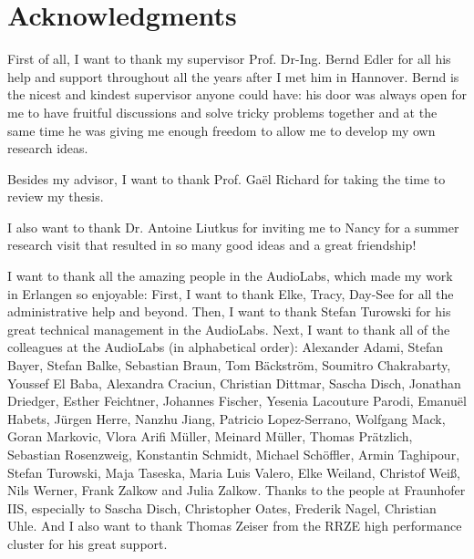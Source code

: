 
\bigskip

\begingroup
\let\clearpage\relax
\let\cleardoublepage\relax
\let\cleardoublepage\relax
\chapter*{Acknowledgments}

First of all, I want to thank my supervisor Prof. Dr-Ing. Bernd Edler for all his help and support throughout all the years after I met him in Hannover. Bernd is the nicest and kindest supervisor anyone could have: his door was always open for me to have fruitful discussions and solve tricky problems together and at the same time he was giving me enough freedom to allow me to develop my own research ideas.

\bigskip

Besides my advisor, I want to thank Prof. Gaël Richard for taking the time to review my thesis.

\bigskip
I also want to thank Dr. Antoine Liutkus for inviting me to Nancy for a summer research visit that resulted in so many good ideas and a great friendship!

\bigskip

I want to thank all the amazing people in the AudioLabs, which made my work in Erlangen so enjoyable: First, I want to thank Elke, Tracy, Day-See for all the administrative help and beyond. Then, I want to thank Stefan Turowski for his great technical management in the AudioLabs. Next, I want to thank all of the colleagues at the AudioLabs (in alphabetical order): 
Alexander Adami, Stefan Bayer, Stefan Balke, Sebastian Braun, Tom Bäckström, Soumitro Chakrabarty, Youssef El Baba, Alexandra Craciun, Christian Dittmar, Sascha Disch, Jonathan Driedger, Esther Feichtner, Johannes Fischer, Yesenia Lacouture Parodi, Emanuël Habets, Jürgen Herre, Nanzhu Jiang, Patricio Lopez-Serrano, Wolfgang Mack, Goran Markovic, Vlora Arifi Müller, Meinard Müller, Thomas Prätzlich, Sebastian Rosenzweig, Konstantin Schmidt, Michael Schöffler, Armin Taghipour, Stefan Turowski, Maja Taseska, Maria Luis Valero, Elke Weiland, Christof Weiß, Nils Werner, Frank Zalkow and Julia Zalkow. Thanks to the people at Fraunhofer IIS, especially to Sascha Disch, Christopher Oates, Frederik Nagel, Christian Uhle.
And I also want to thank Thomas Zeiser from the RRZE high performance cluster for his great support.

